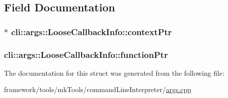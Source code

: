 \subsection{Field Documentation}
\subsubsection[{\texorpdfstring{context\+Ptr}{contextPtr}}]{$\ast$ cli\+::args\+::\+Loose\+Callback\+Info\+::context\+Ptr}\hypertarget{structcli_1_1args_1_1_loose_callback_info_ad5e86ec62a360b6e213f46b8bc5b96c2}{}\label{structcli_1_1args_1_1_loose_callback_info_ad5e86ec62a360b6e213f46b8bc5b96c2}
\subsubsection[{\texorpdfstring{function\+Ptr}{functionPtr}}]{ cli\+::args\+::\+Loose\+Callback\+Info\+::function\+Ptr}\hypertarget{structcli_1_1args_1_1_loose_callback_info_a1d7138169e42d4a4f0ad58fe9c3141bc}{}\label{structcli_1_1args_1_1_loose_callback_info_a1d7138169e42d4a4f0ad58fe9c3141bc}


The documentation for this struct was generated from the following file\+:\begin{DoxyCompactItemize}
\item 
framework/tools/mk\+Tools/command\+Line\+Interpreter/\hyperlink{args_8cpp}{args.\+cpp}\end{DoxyCompactItemize}
